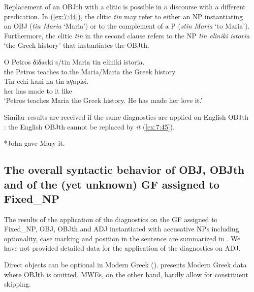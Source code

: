 \documentclass[output=paper]{langsci/langscibook}
\begin{document}
Replacement of an OBJth with a clitic is possible in a discourse with a different predication. In (\ref{ex:7:44}), the clitic {\normalfont \itshape tin} may refer to either an NP instantiating an OBJ ({\normalfont \itshape tin Maria} `Maria') or to the complement of a P ({\normalfont \itshape stin Maria} `to Maria'). Furthermore, the  clitic {\normalfont \itshape tin} in the second clause refers to the NP {\normalfont \itshape tin eliniki istoria} `the Greek history' that instantiates the OBJth.

\ea%
    \label{ex:7:44}
\gll O Petros δiδaski  s/tin Maria tin eliniki istoria.\\
            the Petros teaches to.the Maria/Maria the Greek history \\
\gll Tin echi kani na tin aγapisi.\\
     her has made to it like\\
\glt `Petros teaches Maria the Greek history. He has made her love it.'
\z

Similar results are received if the same diagnostics are applied on English OBJth  \citep{dalrymple2012double}:   the English OBJth cannot be replaced by \textit{it} (\ref{ex:7:45}).

\begin{exe}%
\ex \label{ex:7:45}
*John gave Mary it.\\
\end{exe}

\subsection{The overall syntactic behavior of OBJ, OBJth and of the (yet unknown) GF assigned to Fixed\_NP}

The results of the application of the diagnostics on the GF assigned to Fixed\_NP, OBJ, OBJth and ADJ instantiated with accusative NPs  including optionality, case marking and position in the sentence are summarized in . We have not provided detailed data for the application of the diagnostics on ADJ.

Direct objects can be optional in Modern Greek (\citealt{anastasopoulos2013}). \citet{kordoni2004} presents Modern Greek data where OBJth is omitted. MWEs, on the other hand, hardly allow for constituent skipping.  
\end{document}
